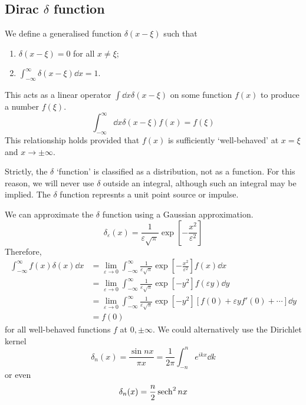 \subsection{Dirac \texorpdfstring{\( \delta \)}{𝛿} function}
\begin{definition}
	We define a generalised function \( \delta(x - \xi) \) such that
	\begin{enumerate}
		\item \( \delta(x-\xi) = 0 \) for all \( x \neq \xi \);
		\item \( \int_{-\infty}^\infty \delta(x-\xi) \dd{x} = 1 \).
	\end{enumerate}
	This acts as a linear operator \( \int \dd{x} \delta(x - \xi) \) on some function \( f(x) \) to produce a number \( f(\xi) \).
	\[
		\int_{-\infty}^\infty \dd{x} \delta(x-\xi) f(x) = f(\xi)
	\]
	This relationship holds provided that \( f(x) \) is sufficiently `well-behaved' at \( x=\xi \) and \( x\to\pm \infty \).
\end{definition}
\begin{remark}
	Strictly, the \( \delta \) `function' is classified as a distribution, not as a function.
	For this reason, we will never use \( \delta \) outside an integral, although such an integral may be implied.
	The \( \delta \) function represnts a unit point source or impulse.
\end{remark}
We can approximate the \( \delta \) function using a Gaussian approximation.
\[
	\delta_\varepsilon(x) = \frac{1}{\varepsilon \sqrt{\pi}} \exp[-\frac{x^2}{\varepsilon^2}]
\]
Therefore,
\begin{align*}
	\int_{-\infty}^\infty f(x) \delta(x) \dd{x} & = \lim_{\varepsilon \to 0} \int_{-\infty}^\infty \frac{1}{\varepsilon \sqrt{\pi}} \exp[-\frac{x^2}{\varepsilon^2}] f(x) \dd{x}            \\
	                                            & = \lim_{\varepsilon \to 0} \int_{-\infty}^\infty \frac{1}{\varepsilon \sqrt{\pi}} \exp[-y^2] f(\varepsilon y) \dd{y}                      \\
	                                            & = \lim_{\varepsilon \to 0} \int_{-\infty}^\infty \frac{1}{\varepsilon \sqrt{\pi}} \exp[-y^2] [f(0) + \varepsilon y f'(0) + \cdots] \dd{y} \\
	                                            & = f(0)
\end{align*}
for all well-behaved functions \( f \) at \( 0, \pm \infty \).
We could alternatively use the Dirichlet kernel
\[
	\delta_n(x) = \frac{\sin n x}{\pi x} = \frac{1}{2\pi} \int_{-n}^n e^{ikx} \dd{k}
\]
or even
\[
	\delta_n(x) = \frac{n}{2} \sech^2 nx
\]

